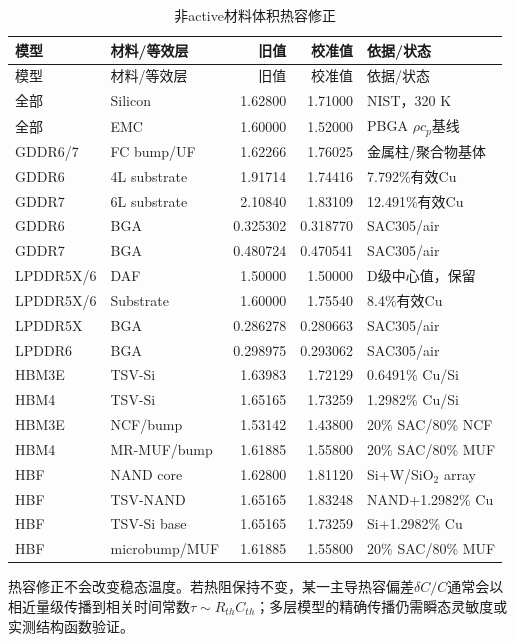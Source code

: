 \documentclass[UTF8,zihao=-4]{ctexart}
\begin{document}
\small
\begin{longtable}{p{2.8cm}p{3.3cm}rrp{3.1cm}}
\caption{非active材料体积热容修正}\label{tab:cv-results}\\
\toprule
模型 & 材料/等效层 & 旧值 & 校准值 & 依据/状态 \\
\midrule
\endfirsthead
\toprule
模型 & 材料/等效层 & 旧值 & 校准值 & 依据/状态 \\
\midrule
\endhead
\bottomrule
\endfoot
全部 & Silicon & 1.62800 & 1.71000 & NIST，320 K \\
全部 & EMC & 1.60000 & 1.52000 & PBGA $\rho c_p$基线 \\
GDDR6/7 & FC bump/UF & 1.62266 & 1.76025 & 金属柱/聚合物基体 \\
GDDR6 & 4L substrate & 1.91714 & 1.74416 & 7.792\%有效Cu \\
GDDR7 & 6L substrate & 2.10840 & 1.83109 & 12.491\%有效Cu \\
GDDR6 & BGA & 0.325302 & 0.318770 & SAC305/air \\
GDDR7 & BGA & 0.480724 & 0.470541 & SAC305/air \\
LPDDR5X/6 & DAF & 1.50000 & 1.50000 & D级中心值，保留 \\
LPDDR5X/6 & Substrate & 1.60000 & 1.75540 & 8.4\%有效Cu \\
LPDDR5X & BGA & 0.286278 & 0.280663 & SAC305/air \\
LPDDR6 & BGA & 0.298975 & 0.293062 & SAC305/air \\
HBM3E & TSV-Si & 1.63983 & 1.72129 & 0.6491\% Cu/Si \\
HBM4 & TSV-Si & 1.65165 & 1.73259 & 1.2982\% Cu/Si \\
HBM3E & NCF/bump & 1.53142 & 1.43800 & 20\% SAC/80\% NCF \\
HBM4 & MR-MUF/bump & 1.61885 & 1.55800 & 20\% SAC/80\% MUF \\
HBF & NAND core & 1.62800 & 1.81120 & Si+W/SiO$_2$ array \\
HBF & TSV-NAND & 1.65165 & 1.83248 & NAND+1.2982\% Cu \\
HBF & TSV-Si base & 1.65165 & 1.73259 & Si+1.2982\% Cu \\
HBF & microbump/MUF & 1.61885 & 1.55800 & 20\% SAC/80\% MUF \\
\end{longtable}
\normalsize

热容修正不会改变稳态温度。若热阻保持不变，某一主导热容偏差$\delta C/C$通常会以相近量级传播到相关时间常数$\tau\sim R_{th}C_{th}$；多层模型的精确传播仍需瞬态灵敏度或实测结构函数验证。
\end{document}
